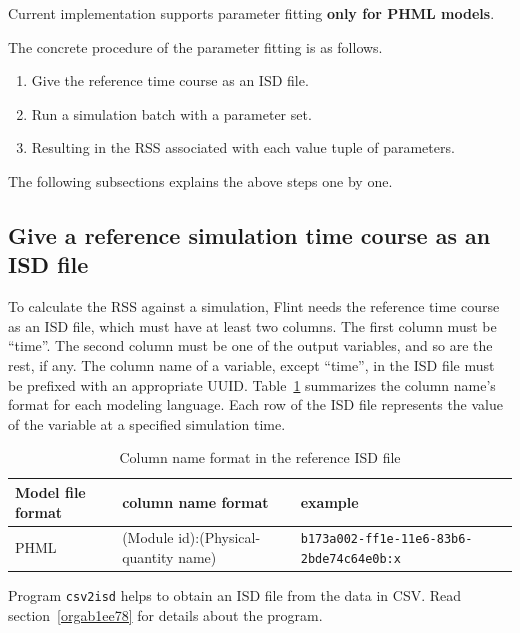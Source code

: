 \documentclass[a4paper,10pt]{report}
\begin{document}
Current implementation supports parameter fitting \textbf{only for PHML models}.

The concrete procedure of the parameter fitting is as follows.

\begin{enumerate}
\item Give the reference time course as an ISD file.
\item Run a simulation batch with a parameter set.
\item Resulting in the RSS associated with each value tuple of parameters.
\end{enumerate}

The following subsections explains the above steps one by one.

\subsection{Give a reference simulation time course  as an ISD file}
\label{sec:orgade890b}
To calculate the RSS against a simulation, Flint needs the reference time course
as an ISD file, which must have at least two columns.
The first column must be ``time''. The second column must be one of the output
variables, and so are the rest, if any.
The column name of a variable, except ``time'', in the ISD file must be prefixed
with an appropriate UUID.
Table~\ref{tab:orgb26e863} summarizes the column name's format for each
modeling language.
Each row of the ISD file represents the value of the variable at a specified
simulation time.

\begin{table}[htbp]
\caption{\label{tab:orgb26e863}Column name format in the reference ISD file}
\centering
\begin{tabular}{lll}
Model file format & column name format & example\\
\hline
PHML & (Module id):(Physical-quantity name) & \texttt{b173a002-ff1e-11e6-83b6-2bde74c64e0b:x}\\
\end{tabular}
\end{table}

Program \texttt{csv2isd} helps to obtain an ISD file from the data in CSV.
Read section~\ref{orgab1ee78} for details about the program.
\end{document}
